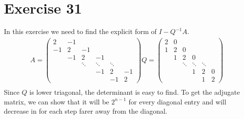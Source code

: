 \section{Exercise 31}
In this exercise we need to find the explicit form of $I-Q^{-1}A$.
\begin{gather*}
A = \left(\begin{array}{cccccc}
2 & -1 &  & & & \\
-1 & 2 & -1 &  & &  \\
 & -1 & 2 & -1 & &  \\
 & & \ddots & \ddots & \ddots & \\
  & & &   -1 & 2 & -1\\
 & & & &  -1 & 2
\end{array} \right)
Q = \left( \begin{array}{cccccc}
2 & 0 &  & & & \\
1 & 2 & 0 &  & &  \\
 & 1 & 2 & 0 & &  \\
 & & \ddots & \ddots & \ddots & \\
  & & &   1 & 2 & 0\\
 & & & &  1 & 2
\end{array} \right) \\
\end{gather*}
Since $Q$ is lower triagonal, the determinant is easy to find. To get the adjugate matrix, we can show that it will be $2^{n-1}$ for every diagonal entry and will decrease in for each step farer away from the diagonal.
